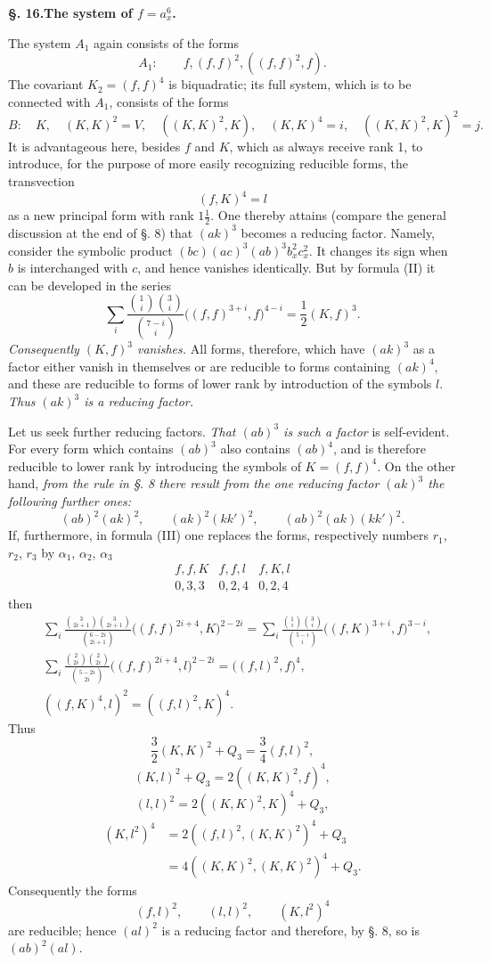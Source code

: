 \documentclass[10pt]{article}
\begin{document}
\begin{center}
{\bfseries §. 16.\quad The system of $f=a_x^6$.}
\end{center}

The system $A_1$ again consists of the forms
\[
A_1:
\qquad f,(f,f)^2,((f,f)^2,f).
\]
The covariant $K_2=(f,f)^4$ is biquadratic; its full system, which is to be connected with $A_1$, consists of the forms
\[
B:
\quad K,
\quad (K,K)^2=V,
\quad ((K,K)^2,K),
\quad (K,K)^4=i,
\quad ((K,K)^2,K)^2=j.
\]
It is advantageous here, besides $f$ and $K$, which as always receive rank 1, to introduce, for the purpose of more easily recognizing reducible forms, the transvection
\[
(f,K)^4=l
\]
as a new principal form with rank $1\frac12$. One thereby attains (compare the general discussion at the end of §. 8) that $(ak)^3$ becomes a reducing factor. Namely, consider the symbolic product $(bc)(ac)^3(ab)^3b_x^2c_x^2$. It changes its sign when $b$ is interchanged with $c$, and hence vanishes identically. But by formula (II) it can be developed in the series
\[
\sum_i\frac{\binom{1}{i}\binom{3}{i}}{\binom{7-i}{i}}
\bigl((f,f)^{3+i},f\bigr)^{4-i}
=\frac12(K,f)^3.
\]
\textit{Consequently $(K,f)^3$ vanishes.} All forms, therefore, which have $(ak)^3$ as a factor either vanish in themselves or are reducible to forms containing $(ak)^4$, and these are reducible to forms of lower rank by introduction of the symbols $l$. \textit{Thus $(ak)^3$ is a reducing factor.}

Let us seek further reducing factors. \textit{That $(ab)^3$ is such a factor} is self-evident. For every form which contains $(ab)^3$ also contains $(ab)^4$, and is therefore reducible to lower rank by introducing the symbols of $K=(f,f)^4$. On the other hand, \textit{from the rule in §. 8 there result from the one reducing factor $(ak)^3$ the following further ones:}
\[
(ab)^2(ak)^2,
\qquad (ak)^2(kk')^2,
\qquad (ab)^2(ak)(kk')^2.
\]
If, furthermore, in formula (III) one replaces the forms, respectively numbers $r_1$, $r_2$, $r_3$ by $\alpha_1$, $\alpha_2$, $\alpha_3$
\[
\begin{array}{ccc}
f,f,K&f,f,l&f,K,l\\
0,3,3&0,2,4&0,2,4
\end{array}
\]
then
\begin{align*}
&\sum_i\frac{\binom{3}{2i+1}\binom{3}{2i+1}}{\binom{6-2i}{2i+1}}\bigl((f,f)^{2i+4},K\bigr)^{2-2i}
=\sum_i\frac{\binom{1}{i}\binom{3}{i}}{\binom{5-i}{i}}\bigl((f,K)^{3+i},f\bigr)^{3-i},\\
&\sum_i\frac{\binom{2}{2i}\binom{2}{2i}}{\binom{5-2i}{2i}}\bigl((f,f)^{2i+4},l\bigr)^{2-2i}=\bigl((f,l)^2,f\bigr)^4,\\
&((f,K)^4,l)^2=((f,l)^2,K)^4.
\end{align*}
Thus
\[
\frac32(K,K)^2+Q_3=\frac34(f,l)^2,
\]
\[
(K,l)^2+Q_3=2((K,K)^2,f)^4,
\]
\[
(l,l)^2=2((K,K)^2,K)^4+Q_3,
\]
\[
\begin{aligned}
(K,l^2)^4&=2((f,l)^2,(K,K)^2)^4+Q_3\\
&=4((K,K)^2,(K,K)^2)^4+Q_3.
\end{aligned}
\]
Consequently the forms
\[
(f,l)^2,
\qquad (l,l)^2,
\qquad (K,l^2)^4
\]
are reducible; hence $(al)^2$ is a reducing factor and therefore, by §. 8, so is $(ab)^2(al)$.
\end{document}
